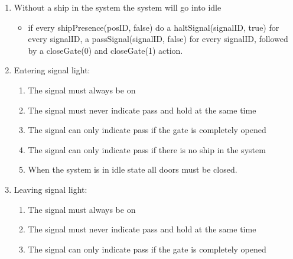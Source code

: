 \begin{enumerate}
	\item Without a ship in the system the system will go into idle
		\begin{itemize}
			\item if every shipPresence(posID, false) do a haltSignal(signalID, true) for every signalID, a passSignal(signalID, false) for every signalID, followed by a closeGate(0) and closeGate(1) action.
		\end{itemize}
	
	\item Entering signal light:
		\begin{enumerate}
			\item The signal must always be on
			\item The signal must never indicate pass and hold at the same time
			\item The signal can only indicate pass if the gate is completely opened
			\item The signal can only indicate pass if there is no ship in the system
			\item When the system is in idle state all doors must be closed.
			
		\end{enumerate}
	\item Leaving signal light:
		\begin{enumerate}
			\item The signal must always be on
			\item The signal must never indicate pass and hold at the same time
			\item The signal can only indicate pass if the gate is completely opened
		\end{enumerate}
\end{enumerate}
